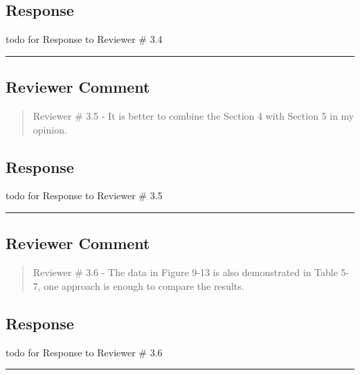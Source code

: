 \subsection{Response}

todo for Response to Reviewer \# 3.4


\noindent\rule{\linewidth}{2.0pt}

\subsection{Reviewer Comment}
\begin{mdframed}
	\begin{quote}
		Reviewer \# 3.5 - It is better to combine the Section 4 with Section 5 in my opinion.
	\end{quote}
\end{mdframed}

\subsection{Response}

todo for Response to Reviewer \# 3.5

\noindent\rule{\linewidth}{2.0pt}

\subsection{Reviewer Comment}
\begin{mdframed}
	\begin{quote}
		Reviewer \# 3.6 - The data in Figure 9-13 is also demonstrated in Table 5-7, one approach is enough to compare the results.
	\end{quote}
\end{mdframed}

\subsection{Response}

todo for Response to Reviewer \# 3.6

\noindent\rule{\linewidth}{6.0pt}